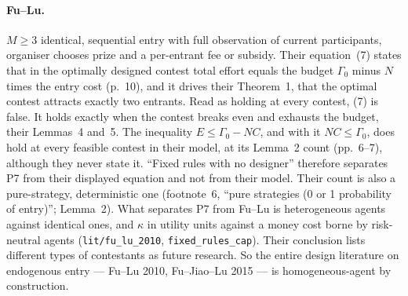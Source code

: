 \documentclass[11pt,a4paper]{article}
\begin{document}
\paragraph{Fu--Lu.} $M \geq 3$ identical, sequential entry with full
observation of current participants, organiser chooses prize and a per-entrant
fee or subsidy. Their equation~(7) states that in the optimally designed
contest total effort equals the budget $\Gamma_0$ minus $N$ times the entry
cost (p.~10), and it drives their Theorem~1, that the optimal contest attracts
exactly two entrants. Read as holding at every contest, (7) is false. It holds
exactly when the contest breaks even and exhausts the budget, their Lemmas~4
and~5. The inequality $E \leq \Gamma_0 - NC$, and with it $NC \leq \Gamma_0$,
does hold at every feasible contest in their model, at its Lemma~2 count
(pp.~6--7), although they never state it. ``Fixed rules with no designer''
therefore separates P7 from their displayed equation and not from their model.
Their count is also a pure-strategy, deterministic one (footnote~6, ``pure
strategies (0 or 1 probability of entry)''; Lemma~2). What separates P7 from
Fu--Lu is heterogeneous agents against identical ones, and $\kappa$ in utility
units against a money cost borne by risk-neutral agents
(\texttt{lit/fu\_lu\_2010}, \texttt{fixed\_rules\_cap}). Their
conclusion lists different types of contestants as future research. So the
entire design literature on endogenous entry --- Fu--Lu 2010, Fu--Jiao--Lu 2015
--- is homogeneous-agent by construction.
\end{document}
